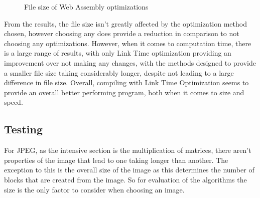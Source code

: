 \documentclass[12pt,a4paper]{article}
\begin{document}
\begin{figure}[H]
    \centering
    \caption{File size of Web Assembly optimizations}
\end{figure}

From the results, the file size isn't greatly affected by the optimization method chosen, however choosing any does provide a reduction in comparison to not choosing any optimizations. However, when it comes to computation time, there is a large range of results, with only Link Time optimization providing an improvement over not making any changes, with the methods designed to provide a smaller file size taking considerably longer, despite not leading to a large difference in file size. Overall, compiling with Link Time Optimization seems to provide an overall better performing program, both when it comes to size and speed.



\subsection{Testing}

For JPEG, as the intensive section is the multiplication of matrices, there aren't properties of the image that lead to one taking longer than another. The exception to this is the overall size of the image as this determines the number of blocks that are created from the image. So for evaluation of the algorithms the size is the only factor to consider when choosing an image.
\end{document}

